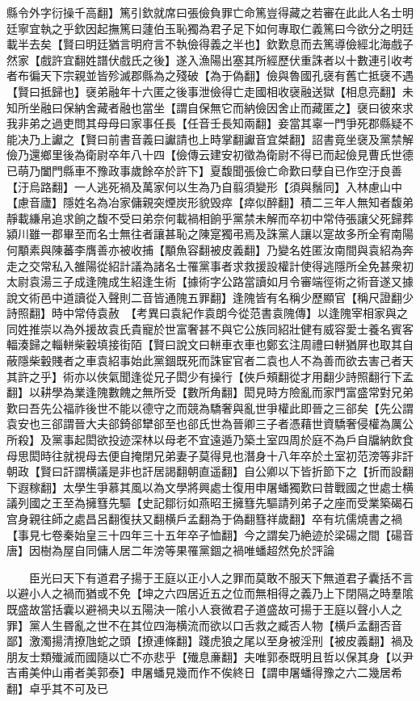 縣令外字衍操千高翻】篤引欽就席曰張儉負罪亡命篤豈得藏之若審在此此人名士明廷寧宜執之乎欽因起撫篤曰蘧伯玉恥獨為君子足下如何專取仁義篤曰今欲分之明廷載半去矣【賢曰明廷猶言明府言不執儉得義之半也】欽歎息而去篤導儉經北海戲子然家【戲許宜翻姓譜伏戲氏之後】遂入漁陽出塞其所經歷伏重誅者以十數連引收考者布徧天下宗親並皆殄滅郡縣為之殘破【為于偽翻】儉與魯國孔襃有舊亡抵襃不遇【賢曰抵歸也】襃弟融年十六匿之後事泄儉得亡走國相收襃融送獄【相息亮翻】未知所坐融曰保納舍藏者融也當坐【謂自保無它而納儉因舍止而藏匿之】襃曰彼來求我非弟之過吏問其母母曰家事任長【任音壬長知兩翻】妾當其辜一門爭死郡縣疑不能决乃上讞之【賢曰前書音義曰讞請也上時掌翻讞音宜桀翻】詔書竟坐襃及黨禁解儉乃還鄉里後為衛尉卒年八十四【儉傳云建安初徵為衛尉不得已而起儉見曹氏世德已萌乃闔門縣車不豫政事歲餘卒於許下】夏馥聞張儉亡命歎曰孽自已作空汙良善【汙烏路翻】一人逃死禍及萬家何以生為乃自翦須變形【須與鬚同】入林慮山中【慮音廬】隱姓名為冶家傭親突煙炭形貌毁瘁【瘁似醉翻】積二三年人無知者馥弟靜載縑帛追求餉之馥不受曰弟奈何載禍相餉乎黨禁未解而卒初中常侍張讓父死歸葬潁川雖一郡畢至而名士無往者讓甚恥之陳寔獨弔焉及誅黨人讓以寔故多所全宥南陽何顒素與陳蕃李膺善亦被收捕【顒魚容翻被皮義翻】乃變名姓匿汝南間與袁紹為奔走之交常私入雒陽從紹計議為諸名士罹黨事者求救援設權計使得逃隱所全免甚衆初太尉袁湯三子成逢隗成生紹逢生術【據術字公路當讀如月令審端徑術之術音遂又據說文術邑中道讀從入聲則二音皆通隗五罪翻】逢隗皆有名稱少歷顯官【稱尺證翻少詩照翻】時中常侍袁赦　【考異曰袁紀作袁朗今從范書袁隗傳】以逢隗宰相家與之同姓推崇以為外援故袁氏貴寵於世富奢甚不與它公族同紹壯健有威容愛士養名賓客輻湊歸之輜軿柴轂填接街陌【賢曰說文曰軿車衣車也鄭玄注周禮曰軿猶屏也取其自蔽隱柴轂賤者之車袁紹事始此黨錮既死而誅宦官者二袁也人不為善而欲去害己者天其許之乎】術亦以俠氣聞逢從兄子閎少有操行【俠戶頰翻從才用翻少詩照翻行下孟翻】以耕學為業逢隗數餽之無所受【數所角翻】閎見時方險亂而家門富盛常對兄弟歎曰吾先公福祚後世不能以德守之而競為驕奢與亂世爭權此即晉之三郤矣【先公謂袁安也三郤謂晉大夫郤錡郤犫郤至也郤氏世為晉卿三子者憑藉世資驕奢侵權為厲公所殺】及黨事起閎欲投迹深林以母老不宜遠遁乃築土室四周於庭不為戶自牖納飲食母思閎時往就視母去便自掩閉兄弟妻子莫得見也潛身十八年卒於土室初范滂等非訐朝政【賢曰訐謂横議是非也訐居謁翻朝直遥翻】自公卿以下皆折節下之【折而設翻下遐稼翻】太學生爭慕其風以為文學將興處士復用申屠蟠獨歎曰昔戰國之世處士横議列國之王至為擁篲先驅【史記鄒衍如燕昭王擁篲先驅請列弟子之座而受業築碣石宫身親往師之處昌呂翻復扶又翻横戶孟翻為于偽翻篲祥歲翻】卒有坑儒燒書之禍【事見七卷秦始皇三十四年三十五年卒子恤翻】今之謂矣乃絶迹於梁碭之間【碭音唐】因樹為屋自同傭人居二年滂等果罹黨錮之禍唯蟠超然免於評論

　　臣光曰天下有道君子揚于王庭以正小人之罪而莫敢不服天下無道君子囊括不言以避小人之禍而猶或不免【坤之六四居近五之位而無相得之義乃上下閉隔之時羣隂既盛故當括囊以避禍夬以五陽決一隂小人衰微君子道盛故可揚于王庭以聲小人之罪】黨人生昬亂之世不在其位四海横流而欲以口舌救之臧否人物【横戶孟翻否音鄙】激濁揚清撩虺蛇之頭【撩連條翻】踐虎狼之尾以至身被淫刑【被皮義翻】禍及朋友士類殱滅而國隨以亡不亦悲乎【殱息亷翻】夫唯郭泰既明且哲以保其身【以尹吉甫美仲山甫者美郭泰】申屠蟠見幾而作不俟終日【謂申屠蟠得豫之六二幾居希翻】卓乎其不可及已

